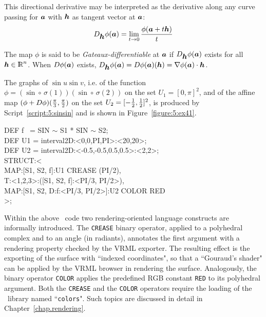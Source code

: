 \documentclass{31x47jw}
\begin{document}
This directional derivative may be interpreted as the
derivative along any curve passing for ${\mbox{\boldmath $a$}}$ with ${\mbox{\boldmath $h$}}$ as tangent
vector at ${\mbox{\boldmath $a$}}$:
\[
D_{{\mbox{\boldmath $h$}}}\phi({\mbox{\boldmath $a$}}) = \lim_{t\rightarrow 0} {{\phi({\mbox{\boldmath $a$}}+t{\mbox{\boldmath $h$}})}\over t}
\]

The map $\phi$ is said to be \emph{Gateaux-differentiable} at ${\mbox{\boldmath $a$}}$ if
$D_{{\mbox{\boldmath $h$}}}\phi({\mbox{\boldmath $a$}})$ exists for all ${\mbox{\boldmath $h$}}\in\mathbb{I\!\!R}^{n}$. When $D\phi({\mbox{\boldmath $a$}})$ 
exists, 
$D_{{\mbox{\boldmath $h$}}}\phi({\mbox{\boldmath $a$}})=D\phi({\mbox{\boldmath $a$}})({\mbox{\boldmath $h$}})=\nabla\phi({\mbox{\boldmath $a$}})\cdot{\mbox{\boldmath $h$}}$.

\begin{example}

The graphs of $\sin u \sin v$, i.e. of the function $\phi =
(\sin\circ\,\sigma(1)) (\sin\circ\,\sigma(2))$ on the set $U_{1} =
[0,\pi]^{2}$, and of the affine map $(\phi + D\phi)({\pi\over
3},{\pi\over 2})$ on the set $U_{2} = [-{1\over 2},{1\over 2}]^{2}$,
is produced by Script~\ref{script:5:sinsin} and is shown in
Figure~\ref{figure:5:ex41}.

\begin{script}
\begin{smallplasm} 
DEF f ~= SIN $\sim$ S1 * SIN $\sim$ S2;\\
DEF U1 = interval2D:<0,0,PI,PI>:<20,20>;\\
DEF U2 = interval2D:<-0.5,-0.5,0.5,0.5>:<2,2>;\\[0.3cm]

STRUCT:< \+\\
  MAP:[S1, S2, f]:U1 CREASE (PI/2),\\
  T:<1,2,3>:([S1, S2, f]:<PI/3, PI/2>),\\
  MAP:[S1, S2, D:f:<PI/3, PI/2>]:U2 COLOR RED\-\\
>;
\end{smallplasm} 
\label{script:5:sinsin}
\end{script}

Within the above \pl\ code two rendering-oriented language constructs
are informally introduced.  The \texttt{CREASE} binary operator,
applied to a polyhedral complex and to an angle (in radiants),
annotates the first argument with a rendering property checked by the
\textsf{VRML} exporter.  The resulting effect is the exporting of the
surface with ``indexed coordinates", so that a ``Gouraud's shader" can be
applied by the \textsf{VRML} browser in rendering the surface. 
Analogously, the binary operator \texttt{COLOR} applies the predefined
RGB constant \texttt{RED} to its polyhedral argument.  Both the
\texttt{CREASE} and the \texttt{COLOR} operators require the loading
of the \pl\ library named ``\texttt{colors}". Such topics are  
discussed in detail in Chapter~\ref{chap.rendering}.


\end{example}
\end{document}
